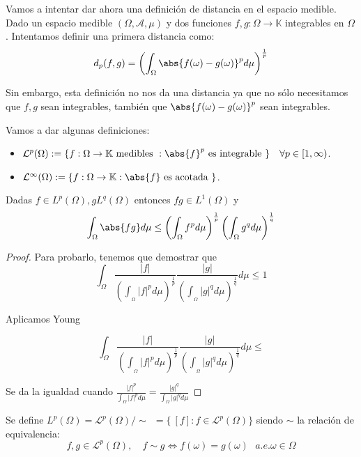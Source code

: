 Vamos a intentar dar ahora una definición de distancia en el espacio medible. Dado un espacio medible $(\Omega, \mathscr A, \mu)$ y dos funciones $f, g: \Omega \rightarrow \mathbb K$ integrables en $\Omega$. Intentamos definir una primera distancia como:
$$d_p (f, g) = \left( \int_{\Omega} \abs{f(\omega) - g(\omega)}^p d \mu \right)^{\frac{1}{p}}$$

Sin embargo, esta definición no nos da una distancia ya que no sólo necesitamos que $f, g$ sean integrables, también que $\abs{f(\omega) - g(\omega)}^p$ sean integrables.

Vamos a dar algunas definiciones:

\begin{itemize}
\item $\mathcal L^p (\Omega) := \{ f: \Omega \rightarrow \mathbb K \text{ medibles } : \abs{f}^p \text{ es integrable } \}\quad \forall p \in [1, \infty)$.
\item $\mathcal L^{\infty} (\Omega) := \{ f: \Omega \rightarrow \mathbb K : \abs{f} \text{ es acotada } \}$.
\end{itemize}

\begin{nprop}[Lema]
  Dadas $f \in L^p (\Omega), g L^q (\Omega)$ entonces $fg \in L^1 (\Omega)$ y $$ \displaystyle \int_{\Omega} \abs{fg}d \mu \leq \left( \int_{\Omega} f^p d \mu \right)^{\frac{1}{p}}\left( \int_{\Omega} g^q d \mu \right)^{\frac{1}{q}}$$
\end{nprop}

\begin{proof}
  Para probarlo, tenemos que demostrar que $$ \int_{\Omega} \frac{|f|}{\left( \int_{_\Omega} |f|^p d \mu \right)^{\frac{1}{p}}} \frac{|g|}{\left( \int_{_\Omega} |g|^q d \mu \right)^{\frac{1}{q}}} d \mu \leq 1$$

  Aplicamos Young

  $$\int_{\Omega} \frac{|f|}{\left( \int_{_\Omega} |f|^p d \mu \right)^{\frac{1}{p}}} \frac{|g|}{\left( \int_{_\Omega} |g|^q d \mu \right)^{\frac{1}{q}}} d \mu \leq $$


  Se da la igualdad cuando $\displaystyle \frac{|f|^p}{\int_{\Omega} |f|^p d \mu } = \frac{|g|^q}{\int_{\Omega} |g|^q d \mu }$
\end{proof}

\begin{ndef}
  Se define $L^p(\Omega) = \mathcal{L}^p(\Omega)/\sim \ \ = \{ \ [f] : f \in \mathcal{L}^p(\Omega) \} $ siendo $\sim$ la relación de equivalencia:
  \[
    f,g\in \mathcal{L}^p(\Omega), \quad f\sim  g \iff f(\omega)= g(\omega) \ \ \ a.e. \omega \in \Omega
  \]

\end{ndef}


